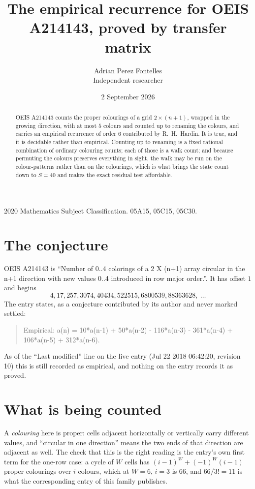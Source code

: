 \documentclass[11pt,a4paper]{article}
\title{The empirical recurrence for OEIS A214143, proved by transfer matrix}
\author{Adrian Perez Fontelles\\ \small Independent researcher}
\date{2 September 2026}
\theoremstyle{plain}
\theoremstyle{definition}
\begin{document}
\maketitle

\begin{abstract}
OEIS A214143 counts the proper colourings of a grid $2\times(n+1)$, wrapped in the growing direction, with at most $5$ colours and
counted up to renaming the colours, and carries an empirical recurrence of order $6$
contributed by R.~H.~Hardin. It is true, and it is decidable rather than empirical. Counting
up to renaming is a fixed rational combination of ordinary colouring counts; each of those is
a walk count; and because permuting the colours preserves everything in sight, the walk may be
run on the colour-patterns rather than on the colourings, which is what brings the state count
down to $S=40$ and makes the exact residual test affordable.
\end{abstract}

\noindent\small 2020 Mathematics Subject Classification. 05A15, 05C15, 05C30.\normalsize

\section{The conjecture}

OEIS A214143 is ``Number of 0..4 colorings of a 2 X (n+1) array circular in the n+1 direction with new values 0..4 introduced in row major order.''. It has offset $1$ and begins
\[
4, 17, 257, 3074, 40434, 522515, 6800539, 88363628,\ \dots
\]
The entry states, as a conjecture contributed by its author and never marked settled:
\begin{quote}
Empirical: a(n) = 10*a(n-1) + 50*a(n-2) - 116*a(n-3) - 361*a(n-4) + 106*a(n-5) + 312*a(n-6).
\end{quote}
As of the ``Last modified'' line on the live entry (Jul 22 2018 06:42:20, revision 10) this is still
recorded as empirical, and nothing on the entry records it as proved.

\section{What is being counted}

A \emph{colouring} here is proper: cells adjacent horizontally or vertically carry different
values, and ``circular in one direction'' means the two ends of that direction are adjacent as
well. The check that this is the right reading is the entry's own first term for the
one-row case: a cycle of $W$ cells has $(i-1)^W+(-1)^W(i-1)$ proper colourings over $i$
colours, which at $W=6$, $i=3$ is $66$, and $66/3!=11$ is what the corresponding entry of this
family publishes.
\end{document}
